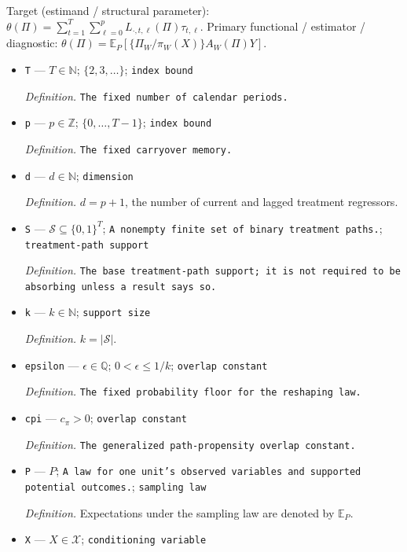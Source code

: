 \documentclass{article}
\begin{document}
Target (estimand / structural parameter): \(\theta(\Pi)=\sum_{t=1}^{T}\sum_{\ell=0}^{p}L_{\cdot,t,\ell}(\Pi)\tau_{t,\ell}\).
Primary functional / estimator / diagnostic: \(\theta(\Pi)=\mathbb E_P[\{\Pi_W/\pi_W(X)\}A_W(\Pi)Y]\).
\begin{itemize}
  \item \texttt{T} --- \(T\in\mathbb N\); \(\{2,3,\ldots\}\); \texttt{index bound}
  \par\smallskip\noindent\emph{Definition.} \texttt{The fixed number of calendar periods.}
  \item \texttt{p} --- \(p\in\mathbb Z\); \(\{0,\ldots,T-1\}\); \texttt{index bound}
  \par\smallskip\noindent\emph{Definition.} \texttt{The fixed carryover memory.}
  \item \texttt{d} --- \(d\in\mathbb N\); \texttt{dimension}
  \par\smallskip\noindent\emph{Definition.} \(d=p+1\), the number of current and lagged treatment regressors.
  \item \texttt{S} --- \(\mathcal S\subseteq\{0,1\}^{T}\); \texttt{A nonempty finite set of binary treatment paths.}; \texttt{treatment-\allowbreak{}path support}
  \par\smallskip\noindent\emph{Definition.} \texttt{The base treatment-\allowbreak{}path support;\allowbreak{} it is not required to be absorbing unless a result says so.}
  \item \texttt{k} --- \(k\in\mathbb N\); \texttt{support size}
  \par\smallskip\noindent\emph{Definition.} \(k=|\mathcal S|\).
  \item \texttt{epsilon} --- \(\epsilon\in\mathbb Q\); \(0<\epsilon\le 1/k\); \texttt{overlap constant}
  \par\smallskip\noindent\emph{Definition.} \texttt{The fixed probability floor for the reshaping law.}
  \item \texttt{cpi} --- \(c_{\pi}>0\); \texttt{overlap constant}
  \par\smallskip\noindent\emph{Definition.} \texttt{The generalized path-\allowbreak{}propensity overlap constant.}
  \item \texttt{P} --- \(P\); \texttt{A law for one unit's observed variables and supported potential outcomes.}; \texttt{sampling law}
  \par\smallskip\noindent\emph{Definition.} Expectations under the sampling law are denoted by \(\mathbb E_{P}\).
  \item \texttt{X} --- \(X\in\mathcal X\); \texttt{conditioning variable}

\end{itemize}
\end{document}

